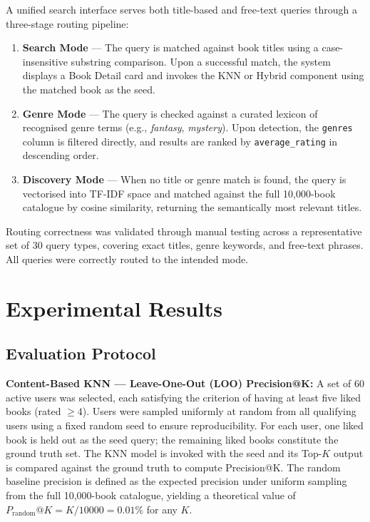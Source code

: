 \documentclass[12pt, a4paper]{article}
\begin{document}
A unified search interface serves both title-based and free-text queries through
a three-stage routing pipeline:

\begin{enumerate}[leftmargin=2cm]
  \item \textbf{Search Mode} --- The query is matched against book titles using a
        case-insensitive substring comparison.
        Upon a successful match, the system displays a Book Detail card and
        invokes the KNN or Hybrid component using the matched book as the seed.
  \item \textbf{Genre Mode} --- The query is checked against a curated lexicon of
        recognised genre terms (e.g., \textit{fantasy}, \textit{mystery}).
        Upon detection, the \texttt{genres} column is filtered directly,
        and results are ranked by \texttt{average\_rating} in descending order.
  \item \textbf{Discovery Mode} --- When no title or genre match is found,
        the query is vectorised into TF-IDF space and matched against the full
        10,000-book catalogue by cosine similarity,
        returning the semantically most relevant titles.
\end{enumerate}

Routing correctness was validated through manual testing across a representative
set of 30 query types, covering exact titles, genre keywords, and free-text phrases.
All queries were correctly routed to the intended mode.

\newpage
\section{Experimental Results}
\label{sec:results}

\subsection{Evaluation Protocol}

\textbf{Content-Based KNN --- Leave-One-Out (LOO) Precision@K:}
A set of 60 active users was selected, each satisfying the criterion of having
at least five liked books (rated $\geq 4$). Users were sampled uniformly at random
from all qualifying users using a fixed random seed to ensure reproducibility.
For each user, one liked book is held out as the seed query;
the remaining liked books constitute the ground truth set.
The KNN model is invoked with the seed and its Top-$K$ output is compared
against the ground truth to compute Precision@K.
The random baseline precision is defined as the expected precision under uniform
sampling from the full 10,000-book catalogue, yielding a theoretical value of
$P_{\text{random}}@K = K / 10000 = 0.01\%$ for any $K$.
\end{document}
